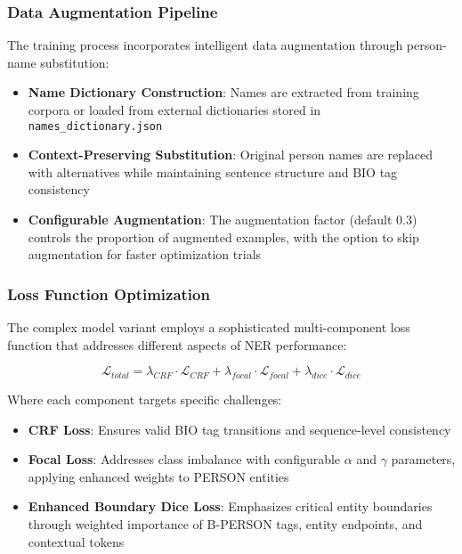 \documentclass[a4paper]{usiinfbachelorproject}
\begin{document}
\subsubsection{Data Augmentation Pipeline}

The training process incorporates intelligent data augmentation through person-name substitution:

\begin{itemize}
    \item \textbf{Name Dictionary Construction}: Names are extracted from training corpora or loaded from external dictionaries stored in \texttt{names\_dictionary.json}
    \item \textbf{Context-Preserving Substitution}: Original person names are replaced with alternatives while maintaining sentence structure and BIO tag consistency
    \item \textbf{Configurable Augmentation}: The augmentation factor (default 0.3) controls the proportion of augmented examples, with the option to skip augmentation for faster optimization trials
\end{itemize}

\subsubsection{Loss Function Optimization}

The complex model variant employs a sophisticated multi-component loss function that addresses different aspects of NER performance:

\begin{equation}
\mathcal{L}_{total} = \lambda_{CRF} \cdot \mathcal{L}_{CRF} + \lambda_{focal} \cdot \mathcal{L}_{focal} + \lambda_{dice} \cdot \mathcal{L}_{dice}
\end{equation}

Where each component targets specific challenges:
\begin{itemize}
    \item \textbf{CRF Loss}: Ensures valid BIO tag transitions and sequence-level consistency
    \item \textbf{Focal Loss}: Addresses class imbalance with configurable $\alpha$ and $\gamma$ parameters, applying enhanced weights to PERSON entities
    \item \textbf{Enhanced Boundary Dice Loss}: Emphasizes critical entity boundaries through weighted importance of B-PERSON tags, entity endpoints, and contextual tokens
\end{itemize}
\end{document}
